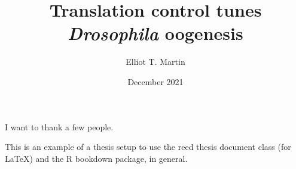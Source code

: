 \documentclass[12pt,oneside]{reedthesis}
\title{Translation control tunes \emph{Drosophila} oogenesis}
\author{Elliot T. Martin}
\date{December 2021}
\begin{document}
  \maketitle

\frontmatter %
\pagestyle{empty} %
  \begin{acknowledgements}
    I want to thank a few people.
  \end{acknowledgements}
  \begin{preface}
    This is an example of a thesis setup to use the reed thesis document class
    (for LaTeX) and the R bookdown package, in general.
  \end{preface}
  \hypersetup{linkcolor=black}
  \setcounter{secnumdepth}{2}
  \setcounter{tocdepth}{2}
  \tableofcontents

  \listoftables
\end{document}
